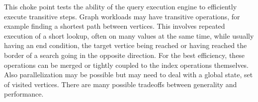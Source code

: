 
This choke point tests the ability of the query execution engine to efficiently
execute transitive steps. Graph workloads may have transitive operations, for
example finding a shortest path between vertices. This involves repeated execution
of a short lookup, often on many values at the same time, while usually having
an end condition, \eg the target vertice being reached or having reached the border
of a search going in the opposite direction. For the best efficiency, these
operations can be merged or tightly coupled to the index operations themselves.
Also parallelization may be possible but may need to deal with a global state,
\eg set of visited vertices. There are many possible tradeoffs between generality
and performance.


